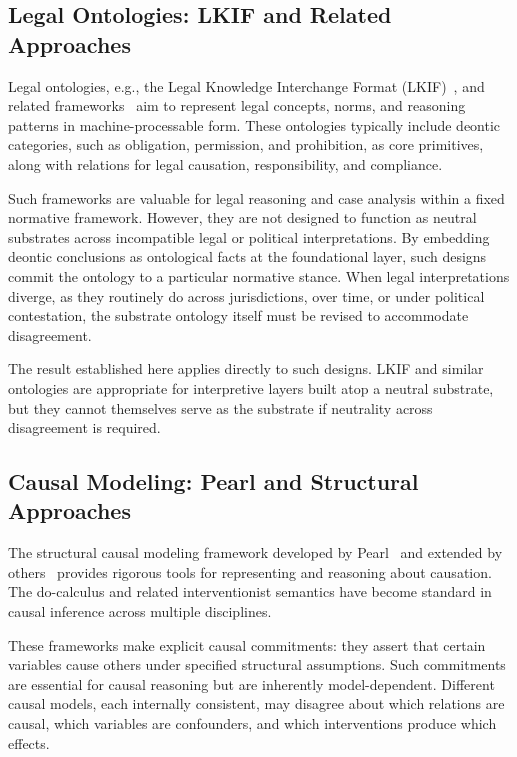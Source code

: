\subsection{Legal Ontologies: LKIF and Related Approaches}

Legal ontologies, e.g., the Legal Knowledge Interchange Format
(LKIF)~\citep{hoekstra2007lkif},
and related frameworks~\citep{sartor2011legal,breuker2009owl}
aim to represent legal concepts, norms, and reasoning patterns
in machine-processable form.
These ontologies typically include deontic categories, such as obligation,
permission, and prohibition, as core primitives,
along with relations for legal causation, responsibility, and compliance.

Such frameworks are valuable for legal reasoning and case analysis
within a fixed normative framework.
However, they are not designed to function as neutral substrates
across incompatible legal or political interpretations.
By embedding deontic conclusions as ontological facts at the foundational layer,
such designs commit the ontology to a particular normative stance.
When legal interpretations diverge,
as they routinely do across jurisdictions, over time,
or under political contestation,
the substrate ontology itself must be revised
to accommodate disagreement.

The result established here
applies directly to such designs.
LKIF and similar ontologies are appropriate for
interpretive layers built atop a neutral substrate,
but they cannot themselves serve as the substrate
if neutrality across disagreement is required.

\subsection{Causal Modeling: Pearl and Structural Approaches}

The structural causal modeling framework developed by Pearl~\citep{pearl2009causality}
and extended by others~\citep{woodward2003making,spirtes2000causation}
provides rigorous tools for representing and reasoning about causation.
The do-calculus and related interventionist semantics
have become standard in causal inference across multiple disciplines.

These frameworks make explicit causal commitments:
they assert that certain variables cause others
under specified structural assumptions.
Such commitments are essential for causal reasoning
but are inherently model-dependent.
Different causal models, each internally consistent,
may disagree about which relations are causal,
which variables are confounders,
and which interventions produce which effects.

